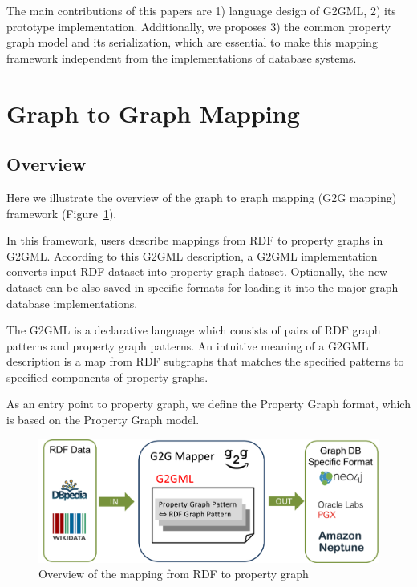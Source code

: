 \documentclass[runningheads]{llncs}
\begin{document}

The main contributions of this papers are 1) language design of G2GML, 2) its prototype implementation. Additionally, we proposes 3) the common property graph model and its serialization, which are essential to make this mapping framework independent from the implementations of database systems.

\section{Graph to Graph Mapping}

\subsection{Overview}

Here we illustrate the overview of the graph to graph mapping (G2G mapping) framework (Figure~\ref{fig:dataflow}).

In this framework, users describe mappings from RDF to property graphs in G2GML.
According to this G2GML description, a G2GML implementation converts input RDF dataset into property graph dataset. Optionally, the new dataset can be also saved in specific formats for loading it into the major graph database implementations.


The G2GML is a declarative language which consists of pairs of RDF graph patterns and property graph patterns. 
An intuitive meaning of a G2GML description is a map from RDF subgraphs that matches the specified patterns to specified components of property graphs.

As an entry point to property graph, we define the Property Graph format, which is based on the Property Graph model.


 
\begin{figure}
\center
\includegraphics[width=1.0\textwidth]{dataflow.png}
\caption{Overview of the mapping from RDF to property graph}
\label{fig:dataflow}
\end{figure}
\end{document}
